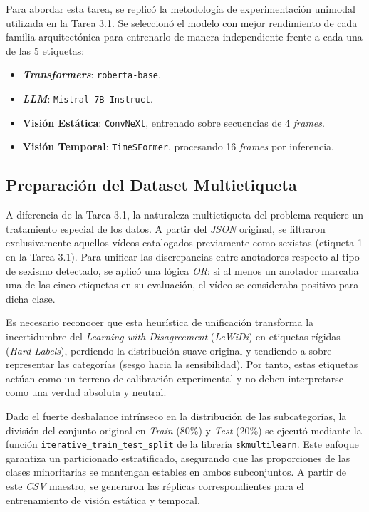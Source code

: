 Para abordar esta tarea, se replicó la metodología de experimentación unimodal utilizada en la Tarea 3.1. Se seleccionó el modelo con mejor rendimiento de cada familia arquitectónica para entrenarlo de manera independiente frente a cada una de las 5 etiquetas:
\begin{itemize}
    \item \textbf{\textit{Transformers}}: \texttt{roberta-base}.
    \item \textbf{\textit{LLM}}: \texttt{Mistral-7B-Instruct}. 
    \item \textbf{Visión Estática}: \texttt{ConvNeXt}, entrenado sobre secuencias de 4 \textit{frames}.
    \item \textbf{Visión Temporal}: \texttt{TimeSFormer}, procesando 16 \textit{frames} por inferencia.
\end{itemize}

\subsection{Preparación del Dataset Multietiqueta}
\label{subsec:PreparacionDelDatasetMultietiqueta}
A diferencia de la Tarea 3.1, la naturaleza multietiqueta del problema requiere un tratamiento especial de los datos. A partir del \textit{JSON} original, se filtraron exclusivamente aquellos vídeos catalogados previamente como sexistas (etiqueta 1 en la Tarea 3.1). Para unificar las discrepancias entre anotadores respecto al tipo de sexismo detectado, se aplicó una lógica \textit{OR}: si al menos un anotador marcaba una de las cinco etiquetas en su evaluación, el vídeo se consideraba positivo para dicha clase. 

Es necesario reconocer que esta heurística de unificación transforma la incertidumbre del \textit{Learning with Disagreement} (\textit{LeWiDi}) en etiquetas rígidas (\textit{Hard Labels}), perdiendo la distribución suave original y tendiendo a sobre-representar las categorías (sesgo hacia la sensibilidad). Por tanto, estas etiquetas actúan como un terreno de calibración experimental y no deben interpretarse como una verdad absoluta y neutral.

Dado el fuerte desbalance intrínseco en la distribución de las subcategorías, la división del conjunto original en \textit{Train} (80\%) y \textit{Test} (20\%) se ejecutó mediante la función \texttt{iterative\_train\_test\_split} de la librería \texttt{skmultilearn}. Este enfoque garantiza un particionado estratificado, asegurando que las proporciones de las clases minoritarias se mantengan estables en ambos subconjuntos. A partir de este \textit{CSV} maestro, se generaron las réplicas correspondientes para el entrenamiento de visión estática y temporal. 


